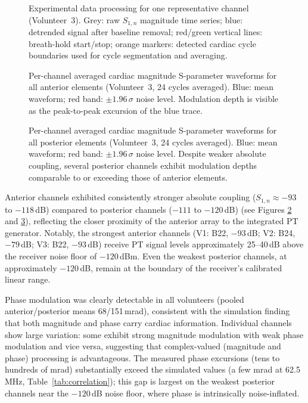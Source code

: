 \documentclass[
]{article}
\begin{document}
\begin{figure}[htbp]
\centering

\caption{Experimental data processing for one representative channel (Volunteer~3). Grey: raw $S_{1,n}$ magnitude time series; blue: detrended signal after baseline removal; red/green vertical lines: breath-hold start/stop; orange markers: detected cardiac cycle boundaries used for cycle segmentation and averaging.}
\label{fig:exp-segmentation}
\end{figure}

\begin{figure}[htbp]
\centering

\caption{Per-channel averaged cardiac magnitude S-parameter waveforms for all anterior elements (Volunteer~3, 24 cycles averaged). Blue: mean waveform; red band: $\pm 1.96\,\sigma$ noise level. Modulation depth is visible as the peak-to-peak excursion of the blue trace.}
\label{fig:exp-anterior-mag}
\end{figure}

\begin{figure}[htbp]
\centering

\caption{Per-channel averaged cardiac magnitude S-parameter waveforms for all posterior elements (Volunteer~3, 24 cycles averaged). Blue: mean waveform; red band: $\pm 1.96\,\sigma$ noise level. Despite weaker absolute coupling, several posterior channels exhibit modulation depths comparable to or exceeding those of anterior elements.}
\label{fig:exp-posterior-mag}
\end{figure}

Anterior channels exhibited consistently stronger absolute coupling ($S_{1,n} \approx -93$ to $-118$\,dB) compared to posterior channels ($-111$ to $-120$\,dB) (see Figures \ref{fig:exp-anterior-mag} and \ref{fig:exp-posterior-mag}), reflecting the closer proximity of the anterior array to the integrated PT generator. Notably, the strongest anterior channels (V1: B22, $-93$\,dB; V2: B24, $-79$\,dB; V3: B22, $-93$\,dB) receive PT signal levels approximately 25--40\,dB above the receiver noise floor of $-120$\,dBm. Even the weakest posterior channels, at approximately $-120$\,dB, remain at the boundary of the receiver's calibrated linear range.

Phase modulation was clearly detectable in all volunteers (pooled anterior/posterior means 68/151\,mrad), consistent with the simulation finding that both magnitude and phase carry cardiac information. Individual channels show large variation: some exhibit strong magnitude modulation with weak phase modulation and vice versa, suggesting that complex-valued (magnitude and phase) processing is advantageous. The measured phase excursions (tens to hundreds of mrad) substantially exceed the simulated values (a few mrad at 62.5\,MHz, Table~\ref{tab:correlation}); this gap is largest on the weakest posterior channels near the $-120$\,dB noise floor, where phase is intrinsically noise-inflated.
\end{document}
